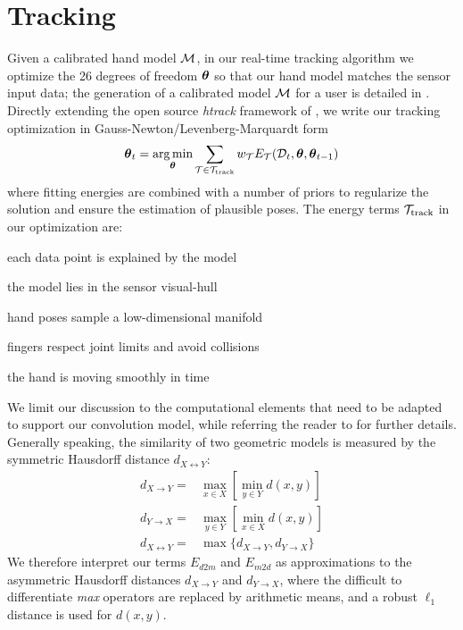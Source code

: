

\section{Tracking}
\label{sec:tracking}
Given a calibrated hand model $\mathcal{M}$, in our real-time tracking algorithm we optimize the 26 degrees of freedom $\boldsymbol{\theta}$ so that our hand model matches the sensor input data; the generation of a calibrated model $\mathcal{M}$ for a user is detailed in . Directly extending the open source \emph{htrack} framework of \cite{tagliasacchi2015robust}, we write our tracking optimization in Gauss-Newton/Levenberg-Marquardt form
% 
\begin{eqnarray}
\boldsymbol{\theta}_t = \operatorname*{arg\,min}_{\boldsymbol{\theta}}
\sum_{\mathcal{T} \in {\mathcal{T}_\text{track}}} 
w_\mathcal{T} E_\mathcal{T}(\mathcal{D}_t,\boldsymbol{\theta},\boldsymbol{\theta}_{t-1})
\label{eq:htrack}
\end{eqnarray}
% 
where fitting energies are combined with a number of priors to regularize the solution and ensure the estimation of plausible poses. The energy terms ${\mathcal{T}_\text{track}}$ in our optimization are:
% 
\begin{description}[labelsep=0em,labelwidth=.6in,labelindent=.25cm]
    \item[d2m] each data point is explained by the model
    \item[m2d] the model lies in the sensor visual-hull
    \item[pose] hand poses sample a low-dimensional manifold
    \item[kinematic] fingers respect joint limits and avoid collisions
    \item[temporal] the hand is moving smoothly in time
\end{description}
% 
We limit our discussion to the computational elements that need to be adapted to support our convolution model, while referring the reader to \cite{tagliasacchi2015robust} for further details. 
% 
Generally speaking, the similarity of two geometric models is measured by the symmetric Hausdorff distance $d_{X \leftrightarrow Y}$:
% 
\begin{eqnarray*}
d_{X \rightarrow Y} =& \max_{x \in X} \left[ \min_{y \in Y} d(x,y) \right] \\
d_{Y \rightarrow X} =& \max_{y \in Y} \left[ \min_{x \in X} d(x,y) \right] \\
d_{X \leftrightarrow Y} =& \max \{ d_{X \rightarrow Y}, d_{Y \rightarrow X} \}
\end{eqnarray*}
We therefore interpret our terms $E_{d2m}$ and $E_{m2d}$ as approximations to the asymmetric Hausdorff distances $d_{X \rightarrow Y}$ and $d_{Y \rightarrow X}$, where the difficult to differentiate \emph{max} operators are replaced by arithmetic means, and a robust $\ell_1$ distance is used for $d(x,y)$. 

